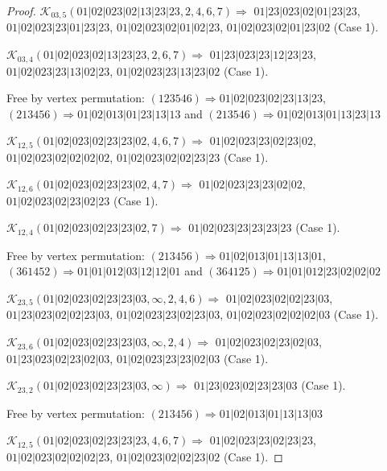 \documentclass[12pt]{article}
\theoremstyle{plain}
\theoremstyle{definition}
\theoremstyle{remark}
\newcommand{\fancy}[1]{\mathcal{#1}}
\def\K{\fancy{K}}
\begin{document}
\begin{proof}
	
	
	\bigskip
	
	$\K_{03,5}(01|02|023|02|13|23|23,2, 4, 6, 7)\Rightarrow $ $01|23|023|02|01|23|23$, $01|02|023|23|01|23|23$, $01|02|023|02|01|02|23$, $01|02|023|02|01|23|02$ (Case 1).
	
	$\K_{03,4}(01|02|023|02|13|23|23,2, 6, 7)\Rightarrow $ $01|23|023|23|12|23|23$, $01|02|023|23|13|02|23$, $01|02|023|23|13|23|02$ (Case 1).
	
	
	
	Free by vertex permutation: $(1 2 3 5 4 6)\Rightarrow 01|02|023|02|23|13|23$, $(2 1 3 4 5 6)\Rightarrow 01|02|013|01|23|13|13$ and $(2 1 3 5 4 6)\Rightarrow 01|02|013|01|13|23|13$
	
	
	
	\bigskip
	
	$\K_{12,5}(01|02|023|02|23|23|02,4, 6, 7)\Rightarrow $ $01|02|023|23|02|23|02$, $01|02|023|02|02|02|02$, $01|02|023|02|02|23|23$ (Case 1).
	
	$\K_{12,6}(01|02|023|02|23|23|02,4, 7)\Rightarrow $ $01|02|023|23|23|02|02$, $01|02|023|02|23|02|23$ (Case 1).
	
	$\K_{12,4}(01|02|023|02|23|23|02,7)\Rightarrow $ $01|02|023|23|23|23|23$ (Case 1).
	
	
	
	Free by vertex permutation: $(2 1 3 4 5 6)\Rightarrow 01|02|013|01|13|13|01$, $(3 6 1 4 5 2)\Rightarrow 01|01|012|03|12|12|01$ and $(3 6 4 1 2 5)\Rightarrow 01|01|012|23|02|02|02$
	
	
	
	\bigskip
	
	$\K_{23,5}(01|02|023|02|23|23|03,\infty,2, 4, 6)\Rightarrow $ $01|02|023|02|02|23|03$, $01|23|023|02|02|23|03$, $01|02|023|23|02|23|03$, $01|02|023|02|02|02|03$ (Case 1).
	
	$\K_{23,6}(01|02|023|02|23|23|03,\infty,2, 4)\Rightarrow $ $01|02|023|02|23|02|03$, $01|23|023|02|23|02|03$, $01|02|023|23|23|02|03$ (Case 1).
	
	$\K_{23,2}(01|02|023|02|23|23|03,\infty)\Rightarrow $ $01|23|023|02|23|23|03$ (Case 1).
	
	
	
	Free by vertex permutation: $(2 1 3 4 5 6)\Rightarrow 01|02|013|01|13|13|03$
	
	
	
	\bigskip
	
	$\K_{12,5}(01|02|023|02|23|23|23,4, 6, 7)\Rightarrow $ $01|02|023|23|02|23|23$, $01|02|023|02|02|02|23$, $01|02|023|02|02|23|02$ (Case 1).
	

\end{proof}
\end{document}
